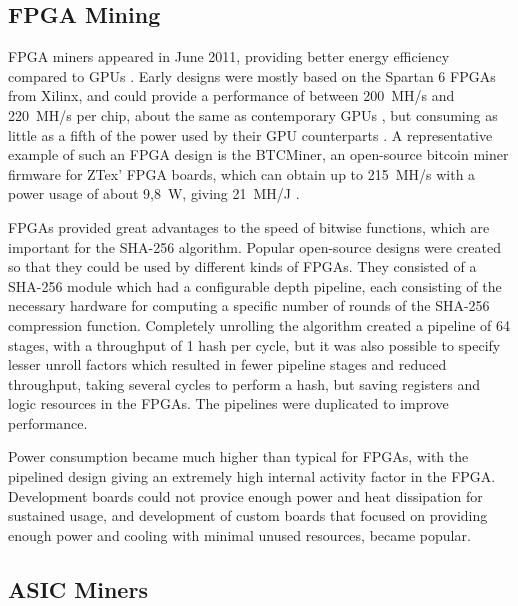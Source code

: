 \subsection{FPGA Mining}
\label{sec:fpga-mining}

FPGA miners appeared in June 2011, providing better energy efficiency compared to GPUs \cite{bespoke-silicon}.
Early designs were mostly based on the Spartan 6 FPGAs from Xilinx, and could provide a
performance of between 200~MH/s and 220~MH/s per chip, about the same as contemporary GPUs \cite{bitcoin-hardware-cmp},
but consuming as little as a fifth of the power used by their GPU counterparts \cite{bespoke-silicon}.
A representative example of such an FPGA design is the BTCMiner, an open-source bitcoin miner firmware for
ZTex' FPGA boards, which can obtain up to 215~MH/s with a power usage of about 9,8~W, giving
21~MH/J \cite{btcminer}.


FPGAs provided great advantages to the speed of bitwise functions, which are important for
the SHA-256 algorithm. Popular open-source designs were created so that they could be used
by different kinds of FPGAs. They consisted of a SHA-256 module which had a configurable depth pipeline, each
consisting of the necessary hardware for computing a specific number of rounds of the
SHA-256 compression function. Completely unrolling the algorithm created a pipeline of
64 stages, with a throughput of 1 hash per cycle, but it was also possible to specify
lesser unroll factors which resulted in fewer pipeline stages and reduced throughput, taking
several cycles to perform a hash, but saving registers and logic resources in the FPGAs.
The pipelines were duplicated to improve performance.

Power consumption became much higher than typical for FPGAs, with the pipelined design
giving an extremely high internal activity factor in the FPGA. Development boards could not provice enough
power and heat dissipation for sustained usage, and development of custom boards that focused
on providing enough power and cooling with minimal unused resources, became popular. \cite{bespoke-silicon}

\subsection{ASIC Miners}
\label{sec:asic}

